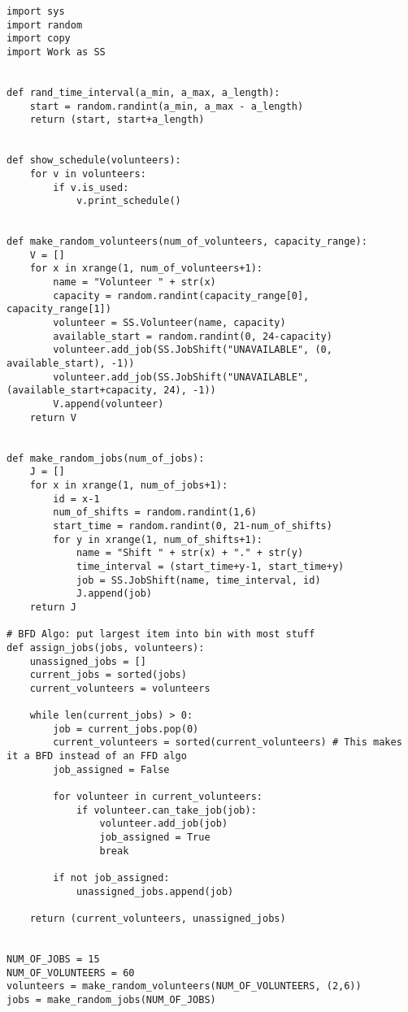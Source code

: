 \documentclass[11pt]{article}
\theoremstyle{definition}
\begin{document}
\begin{lstlisting}
import sys
import random
import copy
import Work as SS


def rand_time_interval(a_min, a_max, a_length):
    start = random.randint(a_min, a_max - a_length)
    return (start, start+a_length)


def show_schedule(volunteers):
    for v in volunteers:
        if v.is_used:
            v.print_schedule()


def make_random_volunteers(num_of_volunteers, capacity_range):
    V = []
    for x in xrange(1, num_of_volunteers+1):
        name = "Volunteer " + str(x)
        capacity = random.randint(capacity_range[0], capacity_range[1])
        volunteer = SS.Volunteer(name, capacity)
        available_start = random.randint(0, 24-capacity)
        volunteer.add_job(SS.JobShift("UNAVAILABLE", (0, available_start), -1))
        volunteer.add_job(SS.JobShift("UNAVAILABLE", (available_start+capacity, 24), -1))
        V.append(volunteer)
    return V


def make_random_jobs(num_of_jobs):
    J = []
    for x in xrange(1, num_of_jobs+1):
        id = x-1
        num_of_shifts = random.randint(1,6)
        start_time = random.randint(0, 21-num_of_shifts)
        for y in xrange(1, num_of_shifts+1):
            name = "Shift " + str(x) + "." + str(y)
            time_interval = (start_time+y-1, start_time+y)
            job = SS.JobShift(name, time_interval, id)
            J.append(job)
    return J

# BFD Algo: put largest item into bin with most stuff
def assign_jobs(jobs, volunteers):
    unassigned_jobs = []
    current_jobs = sorted(jobs)
    current_volunteers = volunteers

    while len(current_jobs) > 0:
        job = current_jobs.pop(0)
        current_volunteers = sorted(current_volunteers) # This makes it a BFD instead of an FFD algo
        job_assigned = False

        for volunteer in current_volunteers:
            if volunteer.can_take_job(job):
                volunteer.add_job(job)
                job_assigned = True
                break

        if not job_assigned:
            unassigned_jobs.append(job)

    return (current_volunteers, unassigned_jobs)


NUM_OF_JOBS = 15
NUM_OF_VOLUNTEERS = 60
volunteers = make_random_volunteers(NUM_OF_VOLUNTEERS, (2,6))
jobs = make_random_jobs(NUM_OF_JOBS)


\end{lstlisting}
\end{document}

